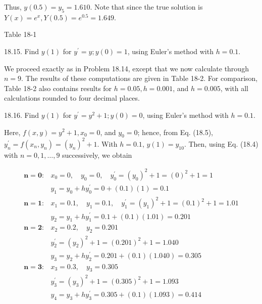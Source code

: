 \documentclass[10pt]{article}
\begin{document}
Thus, $y(0.5)=y_{5}=1.610$. Note that since the true solution is $Y(x)=e^{x}, Y(0.5)=e^{0.5}=1.649$.

Table 18-1

18.15. Find $y(1)$ for $y^{\prime}=y ; y(0)=1$, using Euler's method with $h=0.1$.

We proceed exactly as in Problem 18.14, except that we now calculate through $n=9$. The results of these computations are given in Table 18-2. For comparison, Table 18-2 also contains results for $h=0.05, h=0.001$, and $h=0.005$, with all calculations rounded to four decimal places.

18.16. Find $y(1)$ for $y^{\prime}=y^{2}+1 ; y(0)=0$, using Euler's method with $h=0.1$.

Here, $f(x, y)=y^{2}+1, x_{0}=0$, and $y_{0}=0$; hence, from Eq. (18.5), $y_{n}^{\prime}=f\left(x_{n}, y_{n}\right)=\left(y_{n}\right)^{2}+1$. With $h=0.1$, $y(1)=y_{10}$. Then, using Eq. (18.4) with $n=0,1, \ldots, 9$ successively, we obtain

$$
\begin{array}{ll}
\mathbf{n = 0}: & x_{0}=0, \quad y_{0}=0, \quad y_{0}^{\prime}=\left(y_{0}\right)^{2}+1=(0)^{2}+1=1 \\
& y_{1}=y_{0}+h y_{0}^{\prime}=0+(0.1)(1)=0.1 \\
\mathbf{n = 1 :} & x_{1}=0.1, \quad y_{1}=0.1, \quad y_{1}^{\prime}=\left(y_{1}\right)^{2}+1=(0.1)^{2}+1=1.01 \\
& y_{2}=y_{1}+h y_{1}^{\prime}=0.1+(0.1)(1.01)=0.201 \\
\mathbf{n = 2 :} & x_{2}=0.2, \quad y_{2}=0.201 \\
& y_{2}^{\prime}=\left(y_{2}\right)^{2}+1=(0.201)^{2}+1=1.040 \\
& y_{3}=y_{2}+h y_{2}^{\prime}=0.201+(0.1)(1.040)=0.305 \\
\mathbf{n = 3 :} & x_{3}=0.3, \quad y_{3}=0.305 \\
& y_{3}^{\prime}=\left(y_{3}\right)^{2}+1=(0.305)^{2}+1=1.093 \\
& y_{4}=y_{3}+h y_{3}^{\prime}=0.305+(0.1)(1.093)=0.414
\end{array}
$$
\end{document}
